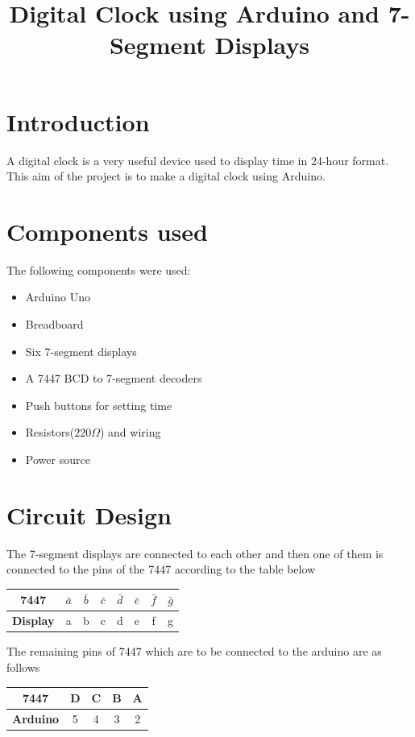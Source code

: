 \documentclass[a4paper,12pt]{article}
\title{Digital Clock using Arduino and 7-Segment Displays}
\author{}
\date{}
\begin{document}
\maketitle

\tableofcontents  
\newpage  

\section{Introduction}
A digital clock is a very useful device used to display time in 24-hour format. This aim of the project is to make a digital clock using  Arduino.

\section{Components used}
The following components were used:
\begin{itemize}
    \item Arduino Uno
    \item Breadboard
    \item Six 7-segment displays
    \item A 7447 BCD to 7-segment decoders
    \item Push buttons for setting time
    \item Resistors($220 \Omega$) and wiring
    \item Power source
\end{itemize}

\section{Circuit Design}
The 7-segment displays are connected to each other and then one of them is connected to the pins of the 7447 according to  the table below

\begin{table}[h]
    \centering
    \begin{tabular}{|c|c|c|c|c|c|c|c|}
        \hline
        \textbf{7447} & $\bar{a}$ & $\bar{b}$ & $\bar{c}$ & $\bar{d}$ & $\bar{e}$ & $\bar{f}$ & $\bar{g}$ \\ \hline
        \textbf{Display} & a & b & c & d & e & f & g \\ \hline
    \end{tabular}
\end{table}
The remaining pins of 7447 which are to be connected to the arduino are as follows
\begin{table}[h]
    \centering
    \begin{tabular}{|c|c|c|c|c|}
        \hline
        \textbf{7447} & D & C & B & A \\ \hline
        \textbf{Arduino} & 5 & 4 & 3 & 2 \\ \hline
    \end{tabular}
\end{table}
\end{document}
